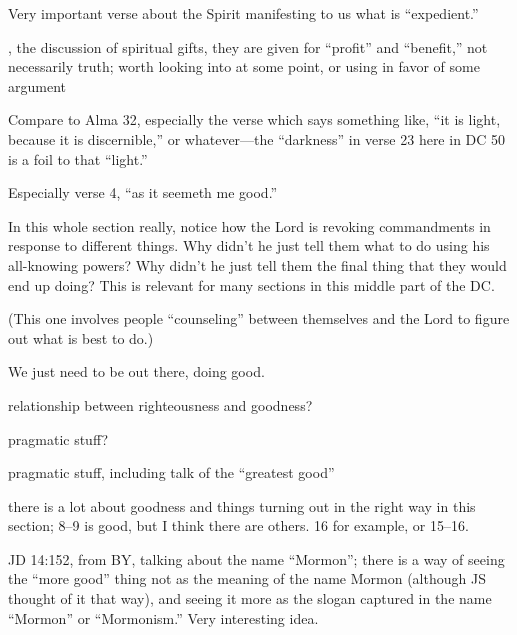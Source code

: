 \begin{compactdesc}
			\item[{\hyperref[DC6-33]{DC 6:33}}] 
			\item[{\hyperref[DC10-20]{DC 10:20}}] 
			\item[{\hyperref[DC11-12]{DC 11:12}}]
			\item[{\hyperref[DC18-18]{DC 18:18}}] Very important verse about the Spirit manifesting to us what is ``expedient.''
			\item[{\hyperref[DC46]{DC 46}}], the discussion of spiritual gifts, they are given for ``profit'' and ``benefit,'' not necessarily truth; worth looking into at some point, or using in favor of some argument
			\item[{\hyperref[DC50-22]{DC 50:22--23}}] Compare to Alma 32, especially the verse which says something like, ``it is light, because it is discernible,'' or whatever---the ``darkness'' in verse 23 here in DC 50 is a foil to that ``light.''
			\item[{\hyperref[DC56-2]{DC 56:2--4}}] Especially verse 4, ``as it seemeth me good.'' 
				\begin{compactitem}
					\item In this whole section really, notice how the Lord is revoking commandments in response to different things. Why didn't he just tell them what to do using his all-knowing powers? Why didn't he just tell them the final thing that they would end up doing? This is relevant for many sections in this middle part of the DC.
				\end{compactitem}
			\item[{\hyperref[DC58-25]{DC 58:25}}] (This one involves people ``counseling'' between themselves and the Lord to figure out what is best to do.)
			\item[{\hyperref[DC58-26]{DC 58:26--33}}] \phantom{.}
				\begin{compactitem}
					\item We just need to be out there, doing good.
				\end{compactitem} 
			\item[{\hyperref[DC67-9]{DC 67:9}}] relationship between righteousness and goodness?
			\item[{\hyperref[DC68-4]{DC 68:4}}] pragmatic stuff?
			\item[{\hyperref[DC81-4]{DC 81:4}}] pragmatic stuff, including talk of the ``greatest good''
			\item[{\hyperref[DC82]{DC 82}}] there is a lot about goodness and things turning out in the right way in this section; 8--9 is good, but I think there are others. 16 for example, or 15--16.
			\item[{\hyperref[DC84-73]{DC 84:73}}]
			\item JD 14:152, from BY, talking about the name ``Mormon''; there is a way of seeing the ``more good'' thing not as the meaning of the name Mormon (although JS thought of it that way), and seeing it more as the slogan captured in the name ``Mormon'' or ``Mormonism.'' Very interesting idea.
			\item[{\hyperref[DC97]{DC 97:7--9}}]
			\item[{\hyperref[DC98-11]{DC 98:11}}] 
			

\end{compactdesc}
